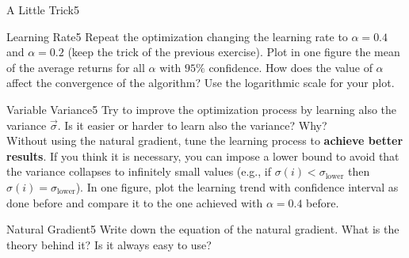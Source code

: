 \begin{questions}
\begin{question}{A Little Trick}{5}
	\begin{answer}

	\end{answer}
\end{question}
	


\begin{question}{Learning Rate}{5}
	Repeat the optimization changing the learning rate to $\alpha=0.4$ and $\alpha = 0.2$ (keep the trick of the previous exercise).
	Plot in one figure the mean of the average returns for all $\alpha$ with $95\%$ confidence.
	How does the value of $\alpha$ affect the convergence of the algorithm? 
	Use the logarithmic scale for your plot.
		
	\begin{answer}

	\end{answer}
\end{question}

	
\begin{question}{Variable Variance}{5}
	Try to improve the optimization process by learning also the variance $\vec \sigma$. Is it easier or harder to learn also the variance? Why?
	\\Without using the natural gradient, tune the learning process to \textbf{achieve better results}. If you think it is necessary, you can impose a lower bound to avoid that the variance collapses to infinitely small values (e.g., if $\sigma(i)<\sigma_{\text{lower}}$ then $\sigma(i) = \sigma_{\text{lower}}$).
	In one figure, plot the learning trend with confidence interval as done before and compare it to the one achieved with $\alpha = 0.4$ before.
	
	\begin{answer}

	\end{answer}
\end{question}


	
\begin{question}[bonus]{Natural Gradient}{5}
	Write down the equation of the natural gradient. What is the theory behind it?
	Is it always easy to use?
	
	\begin{answer}

	\end{answer}
\end{question}

\end{questions}